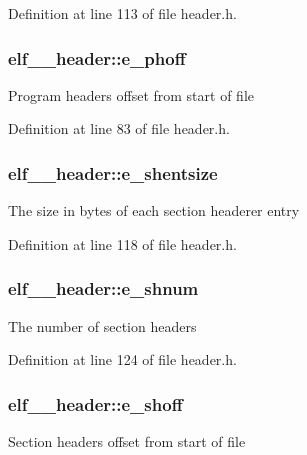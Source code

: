 Definition at line 113 of file header.h.

\hypertarget{structelf__32__header_a3d616010b5daba4da505f8f3ab1f3431}{
\subsubsection[{e\_\-phoff}]{ {\bf elf\_\_\-header::e\_\-phoff}}}
\label{structelf__32__header_a3d616010b5daba4da505f8f3ab1f3431}
Program headers offset from start of file 

Definition at line 83 of file header.h.

\hypertarget{structelf__32__header_a8c6553a68b2f6ef39c613381b0dd1700}{
\subsubsection[{e\_\-shentsize}]{ {\bf elf\_\_\-header::e\_\-shentsize}}}
\label{structelf__32__header_a8c6553a68b2f6ef39c613381b0dd1700}
The size in bytes of each section headerer entry 

Definition at line 118 of file header.h.

\hypertarget{structelf__32__header_a0b59b0c17c7d8676611fa95e6478085d}{
\subsubsection[{e\_\-shnum}]{ {\bf elf\_\_\-header::e\_\-shnum}}}
\label{structelf__32__header_a0b59b0c17c7d8676611fa95e6478085d}
The number of section headers 

Definition at line 124 of file header.h.

\hypertarget{structelf__32__header_aeb68c7843a97cbff85af083bbe583ae0}{
\subsubsection[{e\_\-shoff}]{ {\bf elf\_\_\-header::e\_\-shoff}}}
\label{structelf__32__header_aeb68c7843a97cbff85af083bbe583ae0}
Section headers offset from start of file 


